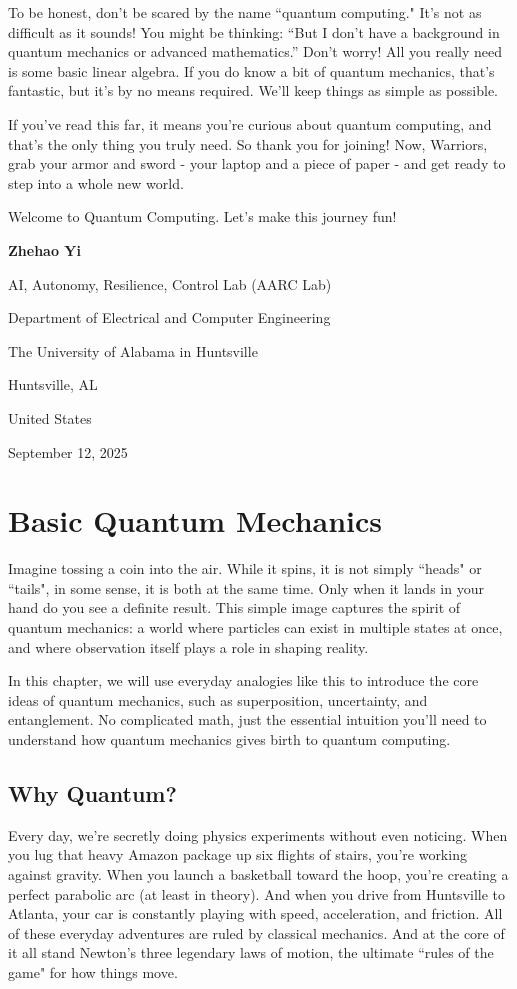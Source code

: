 \documentclass[12pt,oneside]{book}
\begin{document}
To be honest, don't be scared by the name ``quantum computing." It's not as difficult as it sounds! You might be thinking: ``But I don't have a background in quantum mechanics or advanced mathematics.” Don't worry! All you really need is some basic linear algebra. If you do know a bit of quantum mechanics, that's fantastic, but it's by no means required. We'll keep things as simple as possible.

If you've read this far, it means you're curious about quantum computing, and that's the only thing you truly need. So thank you for joining! Now, Warriors, grab your armor and sword - your laptop and a piece of paper - and get ready to step into a whole new world.

Welcome to Quantum Computing. Let's make this journey fun!

\vspace{2em}
\textbf{Zhehao Yi}

AI, Autonomy, Resilience, Control Lab (AARC Lab)

Department of Electrical and Computer Engineering

The University of Alabama in Huntsville

Huntsville, AL 

United States

September 12, 2025

\chapter{Basic Quantum Mechanics}
Imagine tossing a coin into the air. While it spins, it is not simply ``heads" or ``tails", in some sense, it is both at the same time. Only when it lands in your hand do you see a definite result. This simple image captures the spirit of quantum mechanics: a world where particles can exist in multiple states at once, and where observation itself plays a role in shaping reality.

In this chapter, we will use everyday analogies like this to introduce the core ideas of quantum mechanics, such as superposition, uncertainty, and entanglement. No complicated math, just the essential intuition you'll need to understand how quantum mechanics gives birth to quantum computing.
\section{Why Quantum?}
Every day, we're secretly doing physics experiments without even noticing. When you lug that heavy Amazon package up six flights of stairs, you’re working against gravity. When you launch a basketball toward the hoop, you’re creating a perfect parabolic arc (at least in theory). And when you drive from Huntsville to Atlanta, your car is constantly playing with speed, acceleration, and friction. All of these everyday adventures are ruled by classical mechanics. And at the core of it all stand Newton’s three legendary laws of motion, the ultimate ``rules of the game" for how things move.
\end{document}
